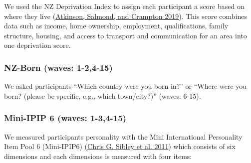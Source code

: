\documentclass[
  singlecolumn]{report}
\begin{document}
We used the NZ Deprivation Index to assign each participant a score
based on where they live (\protect\hyperlink{ref-atkinson2019}{Atkinson,
Salmond, and Crampton 2019}). This score combines data such as income,
home ownership, employment, qualifications, family structure, housing,
and access to transport and communication for an area into one
deprivation score.

\hypertarget{nz-born-waves-1-24-15}{%
\subsubsection{NZ-Born (waves: 1-2,4-15)}\label{nz-born-waves-1-24-15}}

We asked participants ``Which country were you born in?'' or ``Where
were you born? (please be specific, e.g., which town/city?)'' (waves:
6-15).

\hypertarget{mini-ipip-6-waves-1-34-15}{%
\subsubsection{Mini-IPIP 6 (waves:
1-3,4-15)}\label{mini-ipip-6-waves-1-34-15}}

We measured participants personality with the Mini International
Personality Item Pool 6 (Mini-IPIP6)
(\protect\hyperlink{ref-sibley2011}{Chris G. Sibley et al. 2011}) which
consists of six dimensions and each dimensions is measured with four
items:
\end{document}
